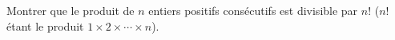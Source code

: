 Montrer que le produit de $n$ entiers positifs consécutifs est divisible par $n!$ ($n!$ étant le produit $1 \times 2 \times \cdots \times n$).
